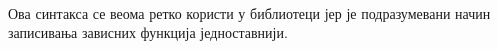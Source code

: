 \begin{code}%
\>[0]\AgdaSpace{}%
\AgdaSymbol{:}\AgdaSpace{}%
\AgdaSymbol{\{}\AgdaSpace{}%
\AgdaSymbol{:}\AgdaSpace{}%
\AgdaSpace{}%
\AgdaSpace{}%
\AgdaSymbol{\}}\AgdaSpace{}%
\AgdaSymbol{(}\AgdaSpace{}%
\AgdaSymbol{:}\AgdaSpace{}%
\AgdaSpace{}%
\AgdaSpace{}%
\AgdaSpace{}%
\AgdaSpace{}%
\AgdaSymbol{)}\AgdaSpace{}%
\AgdaSpace{}%
\AgdaSpace{}%
\AgdaSpace{}%
\AgdaSpace{}%
\<%
\\
\>[0]\AgdaSpace{}%
\AgdaSymbol{\{}\AgdaSymbol{\}}\AgdaSpace{}%
\AgdaSymbol{\{}\AgdaSymbol{\}}\AgdaSpace{}%
\AgdaSymbol{\{}\AgdaSymbol{\}}\AgdaSpace{}%
\AgdaSpace{}%
\AgdaSymbol{=}\AgdaSpace{}%
\AgdaSymbol{(}\AgdaSpace{}%
\AgdaSymbol{:}\AgdaSpace{}%
\AgdaSymbol{)}\AgdaSpace{}%
\AgdaSpace{}%
\AgdaSpace{}%
\<%
\\
%
\\[\AgdaEmptyExtraSkip]%
\>[0]\AgdaSpace{}%
\AgdaSymbol{:}\AgdaSpace{}%
\AgdaSymbol{\{}\AgdaSpace{}%
\AgdaSpace{}%
\AgdaSymbol{:}\AgdaSpace{}%
\AgdaSymbol{\}}\AgdaSpace{}%
\AgdaSymbol{(}\AgdaSpace{}%
\AgdaSymbol{:}\AgdaSpace{}%
\AgdaSpace{}%
\AgdaSpace{}%
\AgdaSymbol{)}\AgdaSpace{}%
\AgdaSymbol{(}\AgdaSpace{}%
\AgdaSymbol{:}\AgdaSpace{}%
\AgdaSpace{}%
\AgdaSpace{}%
\AgdaSpace{}%
\AgdaSpace{}%
\AgdaSymbol{)}\AgdaSpace{}%
\AgdaSpace{}%
\AgdaSpace{}%
\AgdaSpace{}%
\AgdaSpace{}%
\<%
\\
\>[0]\AgdaSpace{}%
\AgdaSpace{}%
\AgdaSpace{}%
\AgdaSymbol{=}\AgdaSpace{}%
\AgdaSpace{}%
\<%
\\
%
\\[\AgdaEmptyExtraSkip]%
\>[0]\AgdaSpace{}%
\AgdaSpace{}%
\AgdaSpace{}%
\AgdaSpace{}%
\AgdaSpace{}%
\AgdaSpace{}%
\AgdaSymbol{)}\AgdaSpace{}%
\AgdaSymbol{=}\AgdaSpace{}%
\AgdaSpace{}%
\AgdaSpace{}%
\AgdaSpace{}%
\AgdaSpace{}%
\AgdaFunction{,}\AgdaSpace{}%
\<%
\end{code}
Ова синтакса се веома ретко користи у библиотеци јер је подразумевани начин записивања зависних функција једноставнији.

